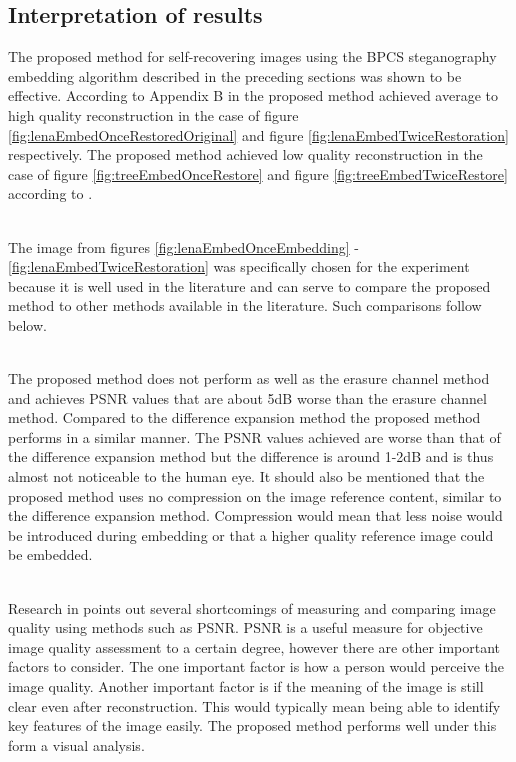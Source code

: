 \documentclass[12pt]{article}
\begin{document}
\subsection{Interpretation of results}
\label{interpretation}
The proposed method for self-recovering images using the BPCS steganography embedding algorithm described in the preceding sections was shown to be effective.
According to Appendix B in \cite{korus2013efficient} the proposed method achieved average to high quality reconstruction in the case of figure \ref{fig:lenaEmbedOnceRestoredOriginal}  and figure \ref{fig:lenaEmbedTwiceRestoration} respectively.
The proposed method achieved low quality reconstruction in the case of figure \ref{fig:treeEmbedOnceRestore} and figure \ref{fig:treeEmbedTwiceRestore} according to \cite{korus2013efficient}.

\hspace{0pt} \\
The image from figures \ref{fig:lenaEmbedOnceEmbedding} - \ref{fig:lenaEmbedTwiceRestoration} was specifically chosen for the experiment because it is well used in the literature and can serve to compare the proposed method to other methods available in the literature.
Such comparisons follow below. 

\hspace{0pt} \\
The proposed method does not perform as well as the erasure channel method and achieves PSNR values that are about 5dB worse than the erasure channel method.
Compared to the difference expansion method the proposed method performs in a similar manner.
The PSNR values achieved are worse than that of the difference expansion method but the difference is around 1-2dB and is thus almost not noticeable to the human eye.
It should also be mentioned that the proposed method uses no compression on the image reference content, similar to the difference expansion method.
Compression would mean that less noise would be introduced during embedding or that a higher quality reference image could be embedded. 

\hspace{0pt} \\
Research in \cite{wang2002image} points out several shortcomings of measuring and comparing image quality using methods such as PSNR. 
PSNR is a useful measure for objective image quality assessment to a certain degree, however there are other important factors to consider. 
The one important factor is how a person would perceive the image quality.
Another important factor is if the meaning of the image is still clear even after reconstruction.
This would typically mean being able to identify key features of the image easily. 
The proposed method performs well under this form a visual analysis.
\end{document}
